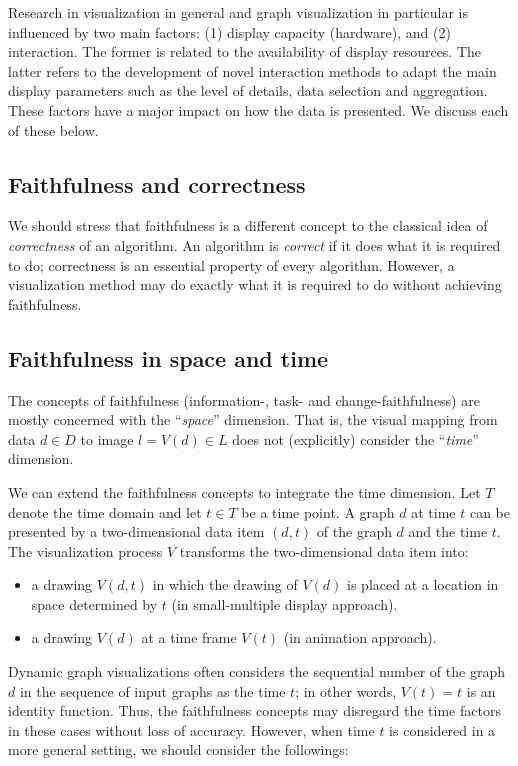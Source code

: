 \documentclass[10pt,journal,cspaper,compsoc]{IEEEtran}
\begin{document}
Research in visualization in general and graph visualization in particular is influenced by two main factors: 
(1) display capacity (hardware), and 
(2) interaction.
The former is related to the availability of display resources.
The latter refers to the development of novel interaction methods to adapt the main display parameters such as the level of details, data selection and aggregation. These factors have a major impact on how the data is presented.
We discuss each of these below.

\subsection{Faithfulness and correctness}
We should stress that faithfulness is a different concept to the classical idea of \emph{correctness} of an algorithm. An algorithm is \emph{correct} if it does what it is required to do; correctness is an essential property of every algorithm. However, a visualization method may do exactly what it is required to do without achieving faithfulness.

\subsection{Faithfulness in space and time}
The concepts of faithfulness (information-, task- and change-faithfulness) are mostly concerned with the ``\emph{space}'' dimension. That is, the visual mapping from data $d \in D$ to image $l=V(d) \in L$ does not (explicitly) consider the ``\emph{time}'' dimension.

We can extend the faithfulness concepts to integrate the time dimension.
Let $T$ denote the time domain and let $t \in T$ be a time point.
A graph $d$ at time $t$ can be presented by a two-dimensional data item $(d,t)$ of the graph $d$ and the time $t$.
The visualization process $V$ transforms the two-dimensional data item into:
\begin{itemize}
\item a drawing $V(d,t)$ in which the drawing of $V(d)$ is placed at a location in space determined by $t$ (in small-multiple display approach).
\item a drawing $V(d)$ at a time frame $V(t)$ (in animation approach).
\end{itemize}

Dynamic graph visualizations often considers the sequential number of the graph $d$ in the sequence of input graphs as the time $t$; in other words, $V(t)=t$ is an identity function.
Thus, the faithfulness concepts may disregard the time factors in these cases without loss of accuracy.
However, when time $t$ is considered in a more general setting, we should consider the followings:
\end{document}
